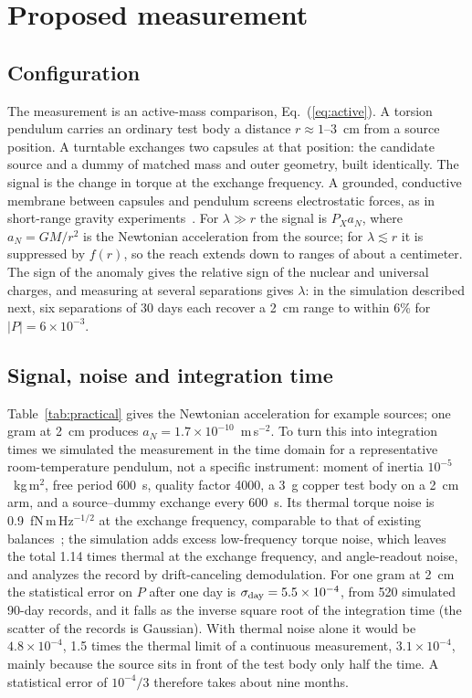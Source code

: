 \documentclass[aps,prd,onecolumn,superscriptaddress,floatfix,nofootinbib]{revtex4-2}
\begin{document}
\FloatBarrier

\section{Proposed measurement}\label{sec:exp}

\subsection{Configuration}

The measurement is an active-mass comparison, Eq.~(\ref{eq:active}). A torsion pendulum carries an ordinary test
body a distance $r\approx1$--$3$~cm from a source position. A turntable exchanges two capsules at that position:
the candidate source and a dummy of matched mass and outer geometry, built identically. The signal is the change
in torque at the exchange frequency. A grounded, conductive membrane between capsules and pendulum screens
electrostatic forces, as in short-range gravity experiments~\cite{Adelberger2009}. For $\lambda\gg r$ the signal is
$P_X a_N$, where $a_N=GM/r^2$ is the Newtonian acceleration from the source; for $\lambda\lesssim r$ it is
suppressed by $f(r)$, so the reach extends down to ranges of about a centimeter. The sign of the anomaly gives the
relative sign of the nuclear and universal charges, and measuring at several separations gives $\lambda$: in the
simulation described next, six separations of 30 days each recover a 2~cm range to within 6\% for
$|P|=6\times10^{-3}$.

\subsection{Signal, noise and integration time}\label{sec:signal}

Table~\ref{tab:practical} gives the Newtonian acceleration for example sources; one gram at 2~cm produces
$a_N=1.7\times10^{-10}$~m\,s$^{-2}$. To turn this into integration times we simulated the measurement in the time
domain for a representative room-temperature pendulum, not a specific instrument: moment of inertia
$10^{-5}$~kg\,m$^2$, free period 600~s, quality factor 4000, a 3~g copper test body on a 2~cm arm, and a
source--dummy exchange every 600~s. Its thermal torque noise is 0.9~fN\,m\,Hz$^{-1/2}$ at the exchange frequency,
comparable to that of existing balances~\cite{Wagner2012,Adelberger2009}; the simulation adds excess low-frequency
torque noise, which leaves the total 1.14 times thermal at the exchange frequency, and angle-readout noise, and
analyzes the record by drift-canceling demodulation. For one gram at
2~cm the statistical error on $P$ after one day is $\sigma_{\rm day}=5.5\times10^{-4}$, from 520 simulated 90-day
records, and it falls as the inverse square root of the integration time (the scatter of the records is Gaussian).
With thermal noise alone it would be $4.8\times10^{-4}$, 1.5 times the thermal limit of a continuous measurement,
$3.1\times10^{-4}$, mainly because the source sits in front of the test body only half the time. A statistical
error of $10^{-4}/3$ therefore takes about nine months.
\end{document}
